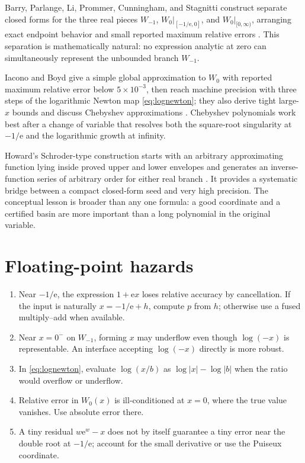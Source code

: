 \documentclass[11pt,oneside]{book}
\theoremstyle{definition}
\theoremstyle{remark}
\newcommand{\ee}{\mathrm e}
\begin{document}
Barry, Parlange, Li, Prommer, Cunningham, and Stagnitti construct separate
closed forms for the three real pieces $W_{-1}$, $W_0|_{[-1/\ee,0]}$, and
$W_0|_{[0,\infty)}$, arranging exact endpoint behavior and small reported
maximum relative errors \cite{barry2000}.  This separation is mathematically
natural: no expression analytic at zero can simultaneously represent the
unbounded branch $W_{-1}$.

Iacono and Boyd give a simple global approximation to $W_0$ with reported
maximum relative error below $5\times10^{-3}$, then reach machine precision
with three steps of the logarithmic Newton map
\eqref{eq:lognewton}; they also derive tight large-$x$ bounds and discuss
Chebyshev approximations \cite{iacono2017}.  Chebyshev polynomials work best
after a change of variable that resolves both the square-root singularity at
$-1/\ee$ and the logarithmic growth at infinity.

Howard's Schroder-type construction starts with an arbitrary approximating
function lying inside proved upper and lower envelopes and generates an
inverse-function series of arbitrary order for either real branch
\cite{howard2025}.  It provides a systematic bridge between a compact
closed-form seed and very high precision.  The conceptual lesson is broader
than any one formula: a good coordinate and a certified basin are more
important than a long polynomial in the original variable.

\section{Floating-point hazards}

\begin{enumerate}
\item Near $-1/\ee$, the expression $1+\ee x$ loses relative accuracy by
cancellation.  If the input is naturally $x=-1/\ee+h$, compute $p$ from $h$;
otherwise use a fused multiply--add when available.
\item Near $x=0^-$ on $W_{-1}$, forming $x$ may underflow even though
$\log(-x)$ is representable.  An interface accepting $\log(-x)$ directly is
more robust.
\item In \eqref{eq:lognewton}, evaluate $\log(x/b)$ as
$\log|x|-\log|b|$ when the ratio would overflow or underflow.
\item Relative error in $W_0(x)$ is ill-conditioned at $x=0$, where the true
value vanishes.  Use absolute error there.
\item A tiny residual $w\ee^w-x$ does not by itself guarantee a tiny error
near the double root at $-1/\ee$; account for the small derivative or use the
Puiseux coordinate.
\end{enumerate}
\end{document}
